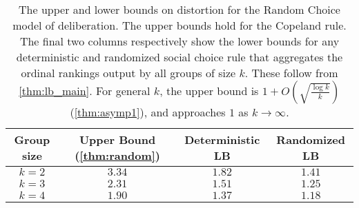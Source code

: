 \begin{table}[htbp]
	\centering
	\begin{tabular}{|c|c|c|c|}
		\toprule
        Group size & Upper Bound  (\cref{thm:random}) & Deterministic LB  & Randomized LB   \\
        \midrule 
        $k = 2$ &  $3.34$ & $1.82$ & $1.41$  \\
        \midrule
        $k = 3$ &  $2.31$ & $1.51$ & $1.25$ \\
           \midrule
        $k = 4$ &   $1.90$  & $1.37$ & $1.18$ \\
      \bottomrule
	\end{tabular}
	\caption{ \label{tab:random} The upper and lower bounds on distortion for the Random Choice model of deliberation. The upper bounds hold for the Copeland rule. The final two columns respectively show the lower bounds for any deterministic and randomized social choice rule that aggregates the ordinal rankings output by all groups of size $k$. These follow from \cref{thm:lb_main}.  For general $k$, the upper bound is $1 + O\left(\sqrt{\frac{\log k}{k}}\right)$ (\cref{thm:asymp1}), and approaches $1$ as $k \rightarrow \infty$.
    }
\end{table}

